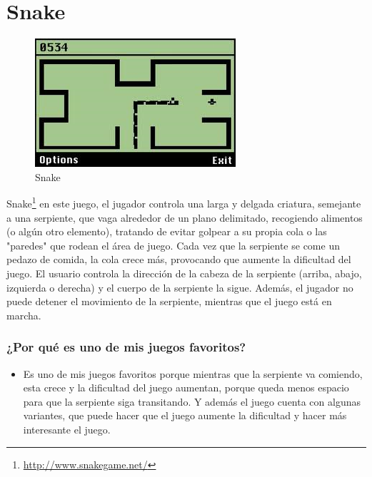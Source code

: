 \section{Snake}

\begin{figure}[htbp]
\begin{center}
\includegraphics[width=.60\textwidth]{./imagenes/snake.png}
\caption{Snake}
\label{Snake}
\end{center}
\end{figure}
Snake\footnote{\url{http://www.snakegame.net/}} en este juego, el jugador controla una larga y delgada criatura, semejante a una serpiente, que vaga alrededor de un plano delimitado, recogiendo alimentos (o algún otro elemento), tratando de evitar golpear a su propia cola o las "paredes" que rodean el área de juego. Cada vez que la serpiente se come un pedazo de comida, la cola crece más, provocando que aumente la dificultad del juego. El usuario controla la dirección de la cabeza de la serpiente (arriba, abajo, izquierda o derecha) y el cuerpo de la serpiente la sigue. Además, el jugador no puede detener el movimiento de la serpiente, mientras que el juego está en marcha.

\subsubsection{¿Por qué es uno de mis juegos favoritos?}
\begin{itemize}
\item Es uno de mis juegos favoritos porque mientras que la serpiente va comiendo, esta crece y la dificultad del juego aumentan, porque queda menos espacio para que la serpiente siga transitando.
Y además el juego cuenta con algunas variantes, que puede hacer que el juego aumente la dificultad y hacer más interesante el juego.

\end{itemize}
